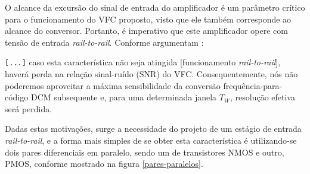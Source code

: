 \documentclass[
	12pt,				%
	oneside,			%
	a4paper,			%
	english,			%
	french,				%
	spanish,			%
	brazil				%
	]{abntex2}
\begin{document}
O alcance da excursão do sinal de entrada do amplificador é um parâmetro crítico para o funcionamento do VFC proposto, visto que ele também corresponde ao alcance do conversor.
Portanto, é imperativo que este amplificador opere com tensão de entrada \textit{rail-to-rail}. Conforme argumentam :
\begin{citacao}
\verb|[...]| caso esta característica não seja atingida [funcionamento \textit{rail-to-rail}], haverá perda na relação sinal-ruído (SNR) do VFC. Consequentemente, nós não poderemos aproveitar a máxima sensibilidade da conversão frequência-para-código DCM subsequente e, para uma determinada janela \(T_W\), resolução efetiva será perdida.  
\end{citacao}
Dadas estas motivações, surge a necessidade do projeto de um estágio de entrada \textit{rail-to-rail}, e a forma mais simples de se obter esta característica é utilizando-se dois pares diferenciais em paralelo, sendo um de transistores NMOS e outro, PMOS, conforme mostrado na figura \ref{pares-paralelos}.
\end{document}
